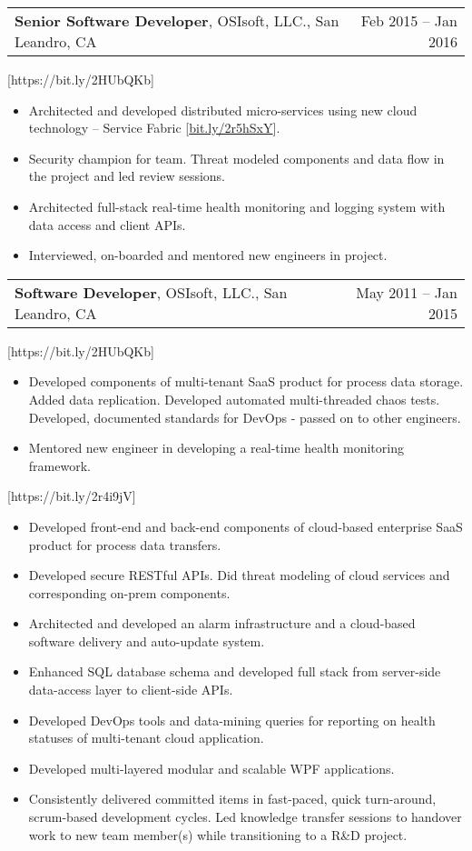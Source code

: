 \documentclass[letterpaper,10pt]{article}
\makeatletter
\newcommand{\experienceItem}[3]{
	\begin{tabular*}{\textwidth}{c@{\extracolsep{\fill}}c}
		\multicolumn{1}{l}{\textbf{#1}, #2} & \multicolumn{1}{r}{#3}\\
	\end{tabular*}\vspace{-10pt}
}
\newcommand{\resumeItemListStart}{\begin{itemize}}
\newcommand{\resumeItemListEnd}{\end{itemize}}
\newcommand{\resumeListItem}[1]{
	\item{#1 \vspace{-6pt}}
}
\makeatother
\begin{document}
	\experienceItem{Senior Software Developer}{OSIsoft, LLC., San Leandro, CA}{Feb 2015 -- Jan 2016}
	
	[https://bit.ly/2HUbQKb]
	
	\resumeItemListStart
	\resumeListItem {Architected and developed distributed micro-services using new cloud technology -- Service Fabric [\href{https://bit.ly/2r5hSxY}{bit.ly/2r5hSxY}].}
	\resumeListItem {Security champion for team. Threat modeled components and data flow in the project and led review sessions.}
	\resumeListItem {Architected full-stack real-time health monitoring and logging system with data access and client APIs.}
	\resumeListItem {Interviewed, on-boarded and mentored new engineers in project.}
	\resumeItemListEnd

	\experienceItem{Software Developer}{OSIsoft, LLC., San Leandro, CA}{May 2011 -- Jan 2015}
	
	[https://bit.ly/2HUbQKb]

	\resumeItemListStart
	\resumeListItem {Developed components of multi-tenant SaaS product for process data storage. Added data replication. Developed automated multi-threaded chaos tests. Developed, documented standards for DevOps -  passed on to other engineers.}
	\resumeListItem {Mentored new engineer in developing a real-time health monitoring framework.}
	\resumeItemListEnd

	[https://bit.ly/2r4i9jV]
	
	\resumeItemListStart
	\resumeListItem {Developed front-end and back-end components of cloud-based enterprise SaaS product for process data transfers.}
	\resumeListItem {Developed secure RESTful APIs. Did threat modeling of cloud services and corresponding on-prem components.}
	\resumeListItem {Architected and developed an alarm infrastructure and a cloud-based software delivery and auto-update system.}
	\resumeListItem {Enhanced SQL database schema and developed full stack from server-side data-access layer to client-side APIs.}
	\resumeListItem {Developed DevOps tools and data-mining queries for reporting on health statuses of multi-tenant cloud application.}
	\resumeListItem {Developed multi-layered modular and scalable WPF applications.}
	\resumeListItem {Consistently delivered committed items in fast-paced, quick turn-around, scrum-based development cycles. Led knowledge transfer sessions to handover work to new team member(s) while transitioning to a R\&D project.}
	\resumeItemListEnd
\end{document}
